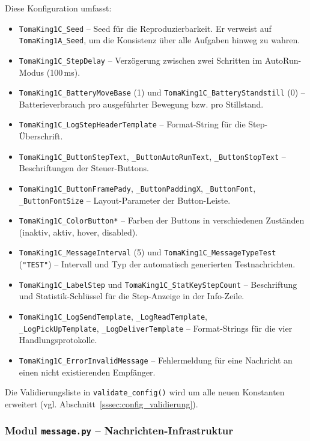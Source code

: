 Diese Konfiguration umfasst:
\begin{itemize}
    \item \texttt{TomaKing1C\_Seed} – Seed für die Reproduzierbarkeit. Er verweist auf \texttt{TomaKing1A\_Seed}, um die Konsistenz über alle Aufgaben hinweg zu wahren.
    \item \texttt{TomaKing1C\_StepDelay} – Verzögerung zwischen zwei Schritten im AutoRun-Modus (100\,ms).
    \item \texttt{TomaKing1C\_BatteryMoveBase} (1) und \texttt{TomaKing1C\_BatteryStandstill} (0) – Batterieverbrauch pro ausgeführter Bewegung bzw. pro Stillstand.
    \item \texttt{TomaKing1C\_LogStepHeaderTemplate} – Format-String für die Step-Überschrift.
    \item \texttt{TomaKing1C\_ButtonStepText}, \texttt{\_ButtonAutoRunText}, \texttt{\_ButtonStopText} – Beschriftungen der Steuer-Buttons.
    \item \texttt{TomaKing1C\_ButtonFramePady}, \texttt{\_ButtonPaddingX}, \texttt{\_ButtonFont}, \texttt{\_ButtonFontSize} – Layout-Parameter der Button-Leiste.
    \item \texttt{TomaKing1C\_ColorButton*} – Farben der Buttons in verschiedenen Zuständen (inaktiv, aktiv, hover, disabled).
    \item \texttt{TomaKing1C\_MessageInterval} (5) und \texttt{TomaKing1C\_MessageTypeTest} (\texttt{"TEST"}) – Intervall und Typ der automatisch generierten Testnachrichten.
    \item \texttt{TomaKing1C\_LabelStep} und \texttt{TomaKing1C\_StatKeyStepCount} – Beschriftung und Statistik-Schlüssel für die Step-Anzeige in der Info-Zeile.
    \item \texttt{TomaKing1C\_LogSendTemplate}, \texttt{\_LogReadTemplate}, \\ \texttt{\_LogPickUpTemplate}, \texttt{\_LogDeliverTemplate} – Format-Strings für die vier Handlungsprotokolle.
    \item \texttt{TomaKing1C\_ErrorInvalidMessage} – Fehlermeldung für eine Nachricht an einen nicht existierenden Empfänger.
\end{itemize}

Die Validierungsliste in \texttt{validate\_config()} wird um alle neuen Konstanten erweitert (vgl. Abschnitt~\ref{sssec:config_validierung}).


\subsubsection{Modul \texttt{message.py} – Nachrichten-Infrastruktur}

